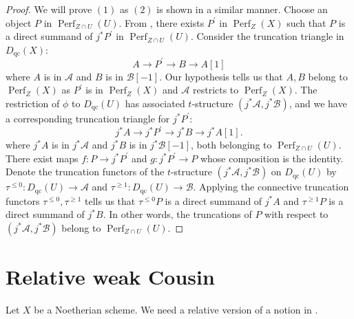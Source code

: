 \documentclass[11pt]{amsart}
\theoremstyle{plain}
\theoremstyle{definition}
\numberwithin{equation}{section}
\numberwithin{theorem}{section}
\begin{document}
\begin{proof}
   We will prove $(1)$ as $(2)$ is shown in a similar manner. Choose an object $P$ in $\operatorname{Perf}_{Z\cap U} (U)$. From , there exists $P^\prime$ in $\operatorname{Perf}_Z (X)$ such that $P$ is a direct summand of $j^\ast P^\prime$ in $\operatorname{Perf}_{Z\cap U}( U)$. Consider the truncation triangle in $D_{\operatorname{qc}}(X)$:
   \begin{displaymath}
       A \to P^\prime \to B \to A[1]
   \end{displaymath}
   where $A$ is in $\mathcal{A}$ and $B$ is in $\mathcal{B}[-1]$. Our hypothesis tells us that $A,B$ belong to $\operatorname{Perf}_Z (X)$ as $P^\prime$ is in $\operatorname{Perf}_Z (X)$ and $\mathcal{A}$ restricts to $\operatorname{Perf}_Z(X)$. The restriction of $\phi$ to $D_{\operatorname{qc}}(U)$ has associated $t$-structure $(j^\ast \mathcal{A},j^\ast \mathcal{B})$, and we have a corresponding truncation triangle for $j^\ast P^\prime$:
   \begin{displaymath}
       j^\ast A \to j^\ast P^\prime \to j^\ast B \to j^\ast A[1].
   \end{displaymath}
   where $j^\ast A$ is in $j^\ast \mathcal{A}$ and $j^\ast B$ is in $j^\ast \mathcal{B}[-1]$, both belonging to $\operatorname{Perf}_{Z\cap U} (U)$. There exist maps $f\colon P \to j^\ast P^\prime$ and $g\colon j^\ast P^\prime \to P$ whose composition is the identity. Denote the truncation functors of the $t$-structure $(j^\ast \mathcal{A},j^\ast \mathcal{B})$ on $D_{\operatorname{qc}}(U)$ by $\tau^{\leq 0} \colon D_{\operatorname{qc}}(U) \to \mathcal{A}$ and $\tau^{\geq 1} \colon D_{\operatorname{qc}}(U) \to \mathcal{B}$. Applying the connective truncation functors $\tau^{\leq 0}, \tau^{\geq 1}$ tells us that $\tau^{\leq 0} P$ is a direct summand of $j^\ast A$ and $\tau^{\geq 1} P$ is a direct summand of $j^\ast B$. In other words, the truncations of $P$ with respect to $(j^\ast \mathcal{A}, j^\ast \mathcal{B})$ belong to $\operatorname{Perf}_{Z\cap U} (U)$.
\end{proof}

\section{Relative weak Cousin}
\label{sec:results1}

Let $X$ be a Noetherian scheme. We need a relative version of a notion in \cite[\S 4]{AlonsoTarrio/JeremiasLopez/Saorin:2010}.
\end{document}
